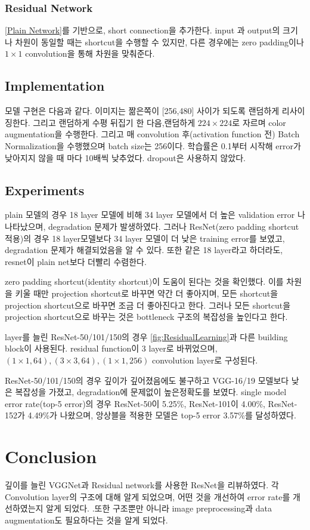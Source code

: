 \documentclass[extendedabs]{bmvc2k}
\begin{document}
\subsubsection{Residual Network}
\ref{Plain Network}를 기반으로, short connection을 추가한다. input 과 output의 크기나 차원이 동일할 때는 shortcut을 수행할 수 있지만, 다른 경우에는 zero padding이나 $1\times1$ convolution을 통해 차원을 맞춰준다. 
\subsection{Implementation}
모델 구현은 다음과 같다. 이미지는 짦은쪽이 [256,480] 사이가 되도록 랜덤하게 리사이징한다. 그리고 랜덤하게 수평 뒤집기 한 다음,랜덤하게 $224\times224$로 자르며 color augmentation을 수행한다. 그리고 매 convolution 후(activation function 전) Batch Normalization을 수행했으며 batch size는 256이다. 학습률은 0.1부터 시작해 error가 낮아지지 않을 때 마다 10배씩 낮추었다. dropout은 사용하지 않았다.
\subsection{Experiments}
plain 모델의 경우 18 layer 모델에 비해 34 layer 모델에서 더 높은 validation error 나 나타났으며, degradation 문제가 발생하였다. 그러나 ResNet(zero padding shortcut 적용)의 경우 18 layer모델보다 34 layer 모델이 더 낮은 training error를 보였고, degradation 문제가 해결되었음을 알 수 있다. 또한 같은 18 layer라고 하더라도, resnet이 plain net보다 더빨리 수렴한다.

zero padding shortcut(identity shortcut)이 도움이 된다는 것을 확인했다. 이를 차원을 키울 때만 projection shortcut로 바꾸면 약간 더 좋아지며, 모든 shortcut을 projection shortcut으로 바꾸면 조금 더 좋아진다고 한다. 그러나 모든 shortcut을 projection shortcut으로 바꾸는 것은 bottleneck 구조의 복잡성을 높인다고 한다.

layer를 늘린 ResNet-50/101/150의 경우 \ref{fig:ResidualLearning}과 다른 building block이 사용된다. residual function이 3 layer로 바뀌었으며, $(1\times1,64),(3\times3,64),(1\times1,256)$ convolution layer로 구성된다.

ResNet-50/101/150의 경우 깊이가 깊어졌음에도 불구하고 VGG-16/19 모델\cite{simonyan2015deepconvolutionalnetworkslargescale}보다 낮은 복잡성을 가졌고, degradation에 문제없이 높은정확도를 보였다. single model error rate(top-5 error)의 경우 ResNet-50이 5.25\%, ResNet-101이 4.00\%, ResNet-152가 4.49\%가 나왔으며, 앙상블을 적용한 모델은 top-5 error 3.57\%를 달성하였다.
\section{Conclusion}
깊이를 늘린 VGGNet\cite{simonyan2015deepconvolutionalnetworkslargescale}과 Residual network를 사용한 ResNet\cite{resnet}을 리뷰하였다. 각 Convolution layer의 구조에 대해 알게 되었으며, 어떤 것을 개선하여 error rate를 개선하였는지 알게 되었다. .또한 구조뿐만 아니라 image preprocessing과 data augmentation도 필요하다는 것을 알게 되었다.
\end{document}
